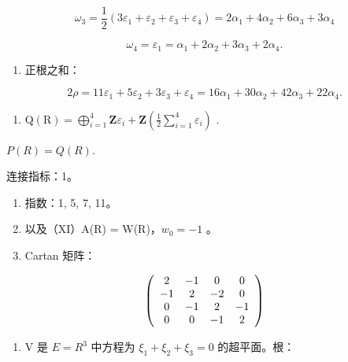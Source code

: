 \[
\omega_ {3} = \frac {1}{2} (3 \varepsilon_ {1} + \varepsilon_ {2} + \varepsilon_ {3} + \varepsilon_ {4}) = 2 \alpha_ {1} + 4 \alpha_ {2} + 6 \alpha_ {3} + 3 \alpha_ {4}
\]

\[
\omega_ {4} = \varepsilon_ {1} = \alpha_ {1} + 2 \alpha_ {2} + 3 \alpha_ {3} + 2 \alpha_ {4}.
\]

\begin{enumerate}
\def\labelenumi{(\Roman{enumi})}
\setcounter{enumi}{6}
\tightlist
\item
  正根之和：
\end{enumerate}

\[
2 \rho = 11 \varepsilon_ {1} + 5 \varepsilon_ {2} + 3 \varepsilon_ {3} + \varepsilon_ {4} = 16 \alpha_ {1} + 30 \alpha_ {2} + 42 \alpha_ {3} + 22 \alpha_ {4}.
\]

\begin{enumerate}
\def\labelenumi{(\Roman{enumi})}
\setcounter{enumi}{7}
\tightlist
\item
  \(\mathrm{Q}(\mathrm{R}) = \bigoplus_{i=1}^{4} \mathbf{Z} \varepsilon_i + \mathbf{Z}\left(\frac{1}{2} \sum_{i=1}^{4} \varepsilon_i\right)\) .
\end{enumerate}

\(P(R) = Q(R).\)

连接指标：1。

\begin{enumerate}
\def\labelenumi{(\Roman{enumi})}
\setcounter{enumi}{8}
\item
  指数：1, 5, 7, 11。
\item
  以及（XI）A(R) = W(R)，\(w_{0} = -1\) 。
\item
  Cartan 矩阵：
\end{enumerate}

\[
\left( \begin{array}{c c c c} 2 & - 1 & 0 & 0 \\ - 1 & 2 & - 2 & 0 \\ 0 & - 1 & 2 & - 1 \\ 0 & 0 & - 1 & 2 \end{array} \right)
\]


\begin{enumerate}
\def\labelenumi{(\Roman{enumi})}
\tightlist
\item
  V 是 \(E = R^{3}\) 中方程为 \(\xi_{1} + \xi_{2} + \xi_{3} = 0\) 的超平面。根：
\end{enumerate}

